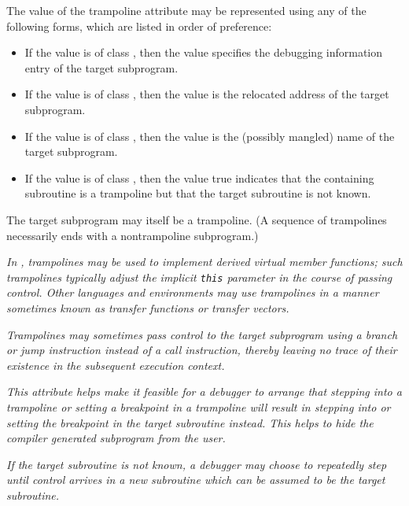 The value of the trampoline attribute may be represented
using any of the following forms, which are listed in order
of preference:

\begin{itemize}
\item If the value is of class \CLASSreference{}, then the value
specifies the debugging information entry of the target
subprogram.

\item If the value is of class \CLASSaddress{}, then the value is
the relocated address of the target subprogram.

\item If the value is of class \CLASSstring{}, then the value is the
(possibly mangled) 
name of the target subprogram.

\item If the value is of class \CLASSflag, then the value true
indicates that the containing subroutine is a trampoline but
that the target subroutine is not known.
\end{itemize}


The target subprogram may itself be a trampoline. (A sequence
of trampolines necessarily ends with a non\dash trampoline
subprogram.)

\textit{In , trampolines may be used to implement 
derived virtual member functions; such trampolines typically 
adjust the implicit 
\texttt{this} parameter
in the course of passing control.  
Other languages and environments may use trampolines in a manner 
sometimes known as transfer functions or transfer vectors.}

\textit{Trampolines may sometimes pass control to the target
subprogram using a branch or jump instruction instead of a
call instruction, thereby leaving no trace of their existence
in the subsequent execution context. }

\textit{This attribute helps make it feasible for a debugger to arrange
that stepping into a trampoline or setting a breakpoint in
a trampoline will result in stepping into or setting the
breakpoint in the target subroutine instead. This helps to
hide the compiler generated subprogram from the user. }

\textit{If the target subroutine is not known, a debugger may choose
to repeatedly step until control arrives in a new subroutine
which can be assumed to be the target subroutine. }


